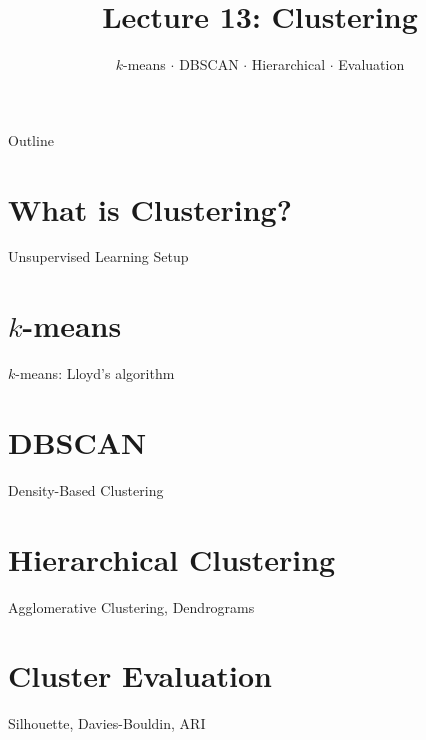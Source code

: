 \documentclass[aspectratio=169]{beamer}
\title{Lecture 13: Clustering}
\subtitle{$k$-means $\cdot$ DBSCAN $\cdot$ Hierarchical $\cdot$ Evaluation}
\date{}
\begin{document}
\begin{frame}\titlepage\end{frame}

\begin{frame}{Outline}
  \tableofcontents
\end{frame}

\section{What is Clustering?}
\begin{frame}{Unsupervised Learning Setup}
\end{frame}

\section{$k$-means}
\begin{frame}{$k$-means: Lloyd's algorithm}
\end{frame}

\section{DBSCAN}
\begin{frame}{Density-Based Clustering}
\end{frame}

\section{Hierarchical Clustering}
\begin{frame}{Agglomerative Clustering, Dendrograms}
\end{frame}

\section{Cluster Evaluation}
\begin{frame}{Silhouette, Davies-Bouldin, ARI}
\end{frame}
\end{document}
